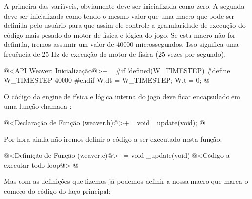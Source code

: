 A primeira das variáveis, obviamente deve ser inicializada como
zero. A segunda deve ser inicializada como tendo o mesmo valor que uma
macro  que pode ser definida pelo usuário para
que assim ele controle a granularidade de execução do código mais
pesado do motor de física e lógica do jogo. Se esta macro não for
definida, iremos assumir um valor de 40000 microssegundos. Isso
significa uma freuência de 25 Hz de execução do motor de física (25
vezes por segundo).

\iniciocodigo
@<API Weaver: Inicialização@>+=
#if !defined(W_TIMESTEP)
#define W_TIMESTEP 40000
#endif
W.dt = W_TIMESTEP;
W.t = 0;
@
\fimcodigo

O código da engine de física e lógica interna do jogo deve ficar
encapsulado em uma função chamada :

\iniciocodigo
@<Declaração de Função (weaver.h)@>+=
void _update(void);
@
\fimcodigo

Por hora ainda não iremos definir o código a ser executado nesta
função:

\iniciocodigo
@<Definição de Função (weaver.c)@>+=
void _update(void){
  @<Código a executar todo loop@>
}
@
\fimcodigo

Mas com as definições que fizemos já podemos definir a nossa macro que
marca o começo do código do laço principal:


